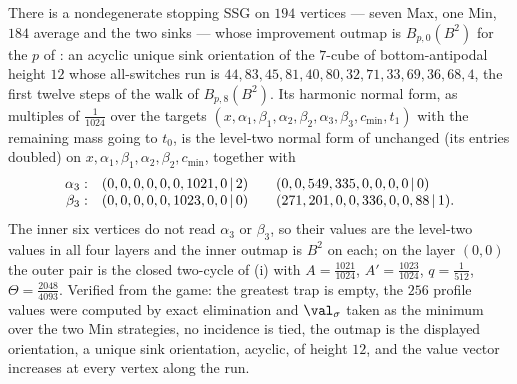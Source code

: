 \begin{proposition}\label{b3:tb}
There is a nondegenerate stopping SSG on $194$ vertices --- seven Max, one Min,
$184$ average and the two sinks --- whose improvement outmap is
$B_{p,0}(B^{2})$ for the $p$ of : an acyclic unique
sink orientation of the $7$-cube of bottom-antipodal height $12$ whose
all-switches run is
$44,83,45,81,40,80,32,71,33,69,36,68,4$, the first twelve steps of the walk of
$B_{p,8}(B^{2})$. Its harmonic normal form, as multiples of $\tfrac1{1024}$ over
the targets $(x,\alpha_1,\beta_1,\alpha_2,\beta_2,\alpha_3,\beta_3,c_{\min},t_1)$
with the remaining mass going to $t_0$, is the level-two normal form of
 unchanged (its entries doubled) on
$x,\alpha_1,\beta_1,\alpha_2,\beta_2,c_{\min}$, together with
\[
 \begin{array}{r@{\quad}l@{\qquad}l}
  \alpha_3: & (0,0,0,0,0,0,1021,0\,|\,2) & (0,0,549,335,0,0,0,0\,|\,0)\\
  \beta_3:  & (0,0,0,0,0,1023,0,0\,|\,0) & (271,201,0,0,336,0,0,88\,|\,1).
 \end{array}
\]
The inner six vertices do not read $\alpha_3$ or $\beta_3$, so their values are
the level-two values in all four layers and the inner outmap is $B^{2}$ on each;
on the layer $(0,0)$ the outer pair is the closed two-cycle of
(i) with $A=\tfrac{1021}{1024}$, $A'=\tfrac{1023}{1024}$,
$q=\tfrac1{512}$, $\Theta=\tfrac{2048}{4093}$. Verified from the game: the
greatest trap is empty, the $256$ profile values were computed by exact
elimination and $\val_\sigma$ taken as the minimum over the two Min strategies,
no incidence is tied, the outmap is the displayed orientation, a unique sink
orientation, acyclic, of height $12$, and the value vector increases at every
vertex along the run.
\end{proposition}

